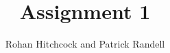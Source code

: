 \documentclass[11pt]{article}
\begin{document}
    \title{\textbf{Assignment 1}}
    \author{Rohan Hitchcock and Patrick Randell}
    \date{}
    \maketitle

    \Blindtext
\end{document}
